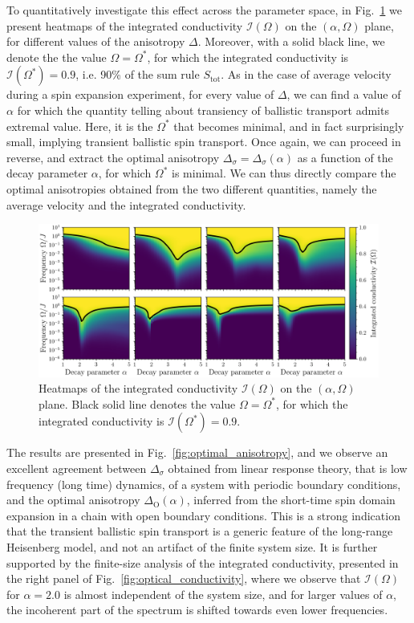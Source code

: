 To quantitatively investigate this effect across the parameter space, in Fig.~\ref{fig:I_cond_heatmap}
we present heatmaps of the integrated conductivity \(\mathcal{I}(\Omega)\) on the \((\alpha ,\Omega)\) plane,
for different values of the anisotropy \(\Delta\). Moreover, with a solid black line, we denote the
the value \(\Omega = \Omega^{\ast}\), for which the integrated conductivity is \(\mathcal{I}(\Omega^{\ast}) = 0.9\),
i.e. 90\% of the sum rule \(S_{\mathrm{tot}}\).
As in the case of average velocity during a spin expansion experiment,
for every value of \(\Delta\), we can find a value of \(\alpha\) for which the quantity telling about transiency
of ballistic transport admits extremal value. Here, it is the \(\Omega^{\ast}\) that becomes minimal,
and in fact surprisingly small, implying transient ballistic spin transport. Once again, we can proceed
in reverse, and extract the optimal anisotropy \(\Delta_{\sigma} = \Delta_{\sigma}(\alpha)\) as a function
of the decay parameter \(\alpha\), for which \(\Omega^{\ast}\) is minimal. We can thus directly compare
the optimal anisotropies obtained from the two different quantities, namely the average velocity and the integrated conductivity.
\begin{figure}[htbp]
  \centering
  \includegraphics[width=\linewidth]{Figures/I_cond_heatmap.png}
  \caption{Heatmaps of the integrated conductivity \(\mathcal{I}(\Omega)\) on the \((\alpha ,\Omega)\) plane.
    Black solid line denotes the value \(\Omega = \Omega^{\ast}\),
    for which the integrated conductivity is \(\mathcal{I} (\Omega^{\ast}) = 0.9\).}
  \label{fig:I_cond_heatmap}
\end{figure}
The results are presented in Fig.~\ref{fig:optimal_anisotropy}, and we observe an excellent
agreement between \(\Delta_{\sigma}\) obtained from linear response theory, that is low frequency (long time) dynamics,
of a system with periodic boundary conditions,
and the optimal anisotropy \(\Delta_{\mathrm{O}}(\alpha)\), inferred from the short-time spin domain expansion in a chain
with open boundary conditions. This is a strong indication that the transient ballistic spin transport
is a generic feature of the long-range Heisenberg model, and not an artifact of the finite system size.
It is further supported by the finite-size analysis of the integrated conductivity, presented in the right panel
of Fig.~\ref{fig:optical_conductivity}, where we observe that \(\mathcal{I}(\Omega)\) for \(\alpha = 2.0\)
is almost independent of the system size, and for larger values of \(\alpha\), the incoherent part of the spectrum
is shifted towards even lower frequencies.

